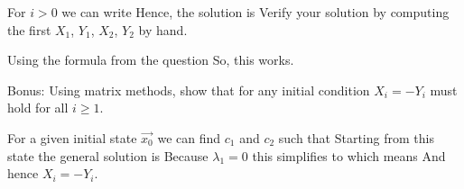 \solution
For $i>0$ we can write 
Hence, the solution is 
\subquestion 
Verify your solution by computing the first $X_1$, $Y_1$, $X_2$, $Y_2$ by hand.

\solution
Using the formula from the question
So, this works. 

\subquestion
Bonus: Using matrix methods, show that for any initial condition $X_i=-Y_i$ must hold for all $i\geq 1$.

\solution
For a given initial state $\vec{x_0}$ we can find $c_1$ and $c_2$ such that
Starting from this state the general solution is 
Because $\lambda_1=0$ this simplifies to 
which means
And hence $X_i=-Y_i$.
